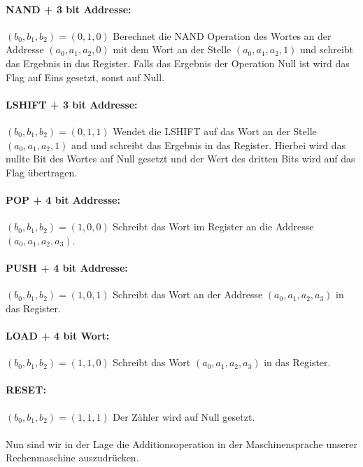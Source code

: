 \documentclass[11pt,a4paper,leqno]{report}
\numberwithin{equation}{chapter}
\begin{document}
\paragraph{NAND + 3 bit Addresse:} $(b_0, b_1, b_2) = (0, 1, 0)$ Berechnet die NAND Operation des Wortes an der Addresse $(a_0, a_1, a_2, 0)$ mit dem Wort an der Stelle $(a_0, a_1, a_2, 1)$ und schreibt das Ergebnis in das Register. Falls das Ergebnis der Operation Null ist wird das Flag auf Eins gesetzt, sonst auf Null.
\paragraph{LSHIFT + 3 bit Addresse:} $(b_0, b_1, b_2) = (0, 1, 1)$ Wendet die LSHIFT auf das Wort an der Stelle $(a_0, a_1, a_2, 1)$ and und schreibt das Ergebnis in das Register. Hierbei wird das nullte Bit des Wortes auf Null gesetzt und der Wert des dritten Bits wird auf das Flag \"ubertragen.
\paragraph{POP + 4 bit Addresse:} $(b_0, b_1, b_2) = (1, 0, 0)$ Schreibt das Wort im Register an die Addresse $(a_0, a_1, a_2, a_3)$.
\paragraph{PUSH + 4 bit Addresse:} $(b_0, b_1, b_2) = (1, 0, 1)$ Schreibt das Wort an der Addresse $(a_0, a_1, a_2, a_3)$ in das Register.
\paragraph{LOAD + 4 bit Wort:} $(b_0, b_1, b_2) = (1, 1, 0)$ Schreibt das Wort $(a_0, a_1, a_2, a_3)$ in das Register.
\paragraph{RESET:} $(b_0, b_1, b_2) = (1, 1, 1)$ Der Z\"ahler wird auf Null gesetzt.
\\
\\
Nun sind wir in der Lage die Additionsoperation in der Maschinensprache unserer Rechenmaschine auszudr\"ucken.
\end{document}
